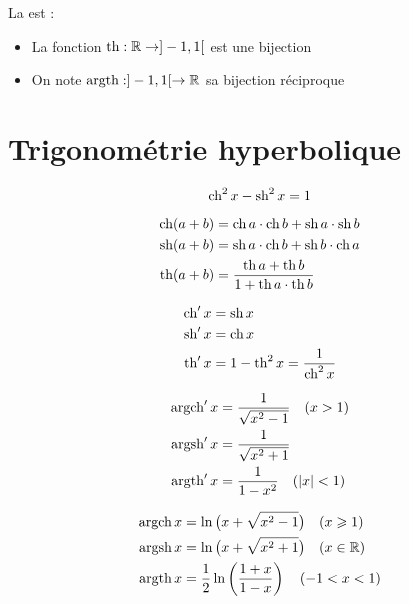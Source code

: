 \begin{frame}
La  est :
\pause  
\bigskip
\begin{itemize}
  \item La fonction $\tanh : \Rr \to ]-1,1[$ est une bijection
  \item On note $\Argth : ]-1,1[\to\Rr$ sa bijection réciproque
\end{itemize}

\pause


\end{frame}




\section{Trigonométrie hyperbolique}

\begin{frame}


$$\ch^2 x - \sh^2 x = 1$$

\pause

\begin{align*}
\ch(a+b)&=\ch a\cdot\ch b + \sh a\cdot\sh b\\ 
\sh(a+b)&=\sh a\cdot\ch b  +  \sh b\cdot\ch a\\
\tanh (a+b)&=\frac{\tanh a + \tanh b}{1+\tanh a\cdot\tanh b}\\
\end{align*}

\pause

\begin{align*}
\ch'x&= \sh x\\
\sh'x&=\ch x\\
\tanh' x &= 1-\tanh^2x=\frac{1}{\ch^2x}\\
\end{align*}


\end{frame}



\begin{frame}

\begin{align*}
\Argch'x&=\frac{1}{\sqrt{x^2-1}} \quad (x>1)\\
\Argsh'x&=\frac{1}{\sqrt{x^2+1}} \\
\Argth'x&=\frac{1}{1-x^2} \quad (|x|<1)\\
\end{align*}

\pause

\begin{align*}
\Argch x&= \ln\big(x+ \sqrt{x^2-1}\big) \quad (x\ge1)\\
\Argsh x&= \ln\big(x+ \sqrt{x^2+1}\big)  \quad (x \in \Rr) \\
\Argth x&= \frac12\ln\left(\frac{1+x}{1-x}\right) \quad (-1<x<1) \\
\end{align*}

\end{frame}

